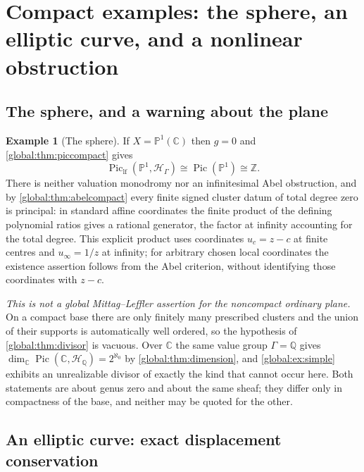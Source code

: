 \documentclass[11pt,letterpaper]{article}
\theoremstyle{definition}
\newtheorem{example}[example]{Example}
\theoremstyle{remark}
\newcommand{\C}{\mathbb C}
\newcommand{\Z}{\mathbb Z}
\newcommand{\Q}{\mathbb Q}
\newcommand{\HH}{\mathscr H_\Gamma}
\newcommand{\Pic}{\operatorname{Pic}}
\newcommand{\Piclf}{\operatorname{Pic}_{\mathrm{lf}}}
\numberwithin{equation}{section}
\begin{document}
\section{Compact examples: the sphere, an elliptic curve, and a nonlinear obstruction}\label{global:sec:compactexamples}

\subsection{The sphere, and a warning about the plane}

\begin{example}[The sphere]\label{global:ex:sphere}
If $X=\mathbb P^1(\C)$ then $g=0$ and \cref{global:thm:piccompact} gives
\[
  \Piclf(\mathbb P^1,\HH)\cong\Pic(\mathbb P^1)\cong\Z .
\]
There is neither valuation monodromy nor an infinitesimal Abel obstruction, and by \cref{global:thm:abelcompact} every finite signed cluster datum of total degree zero is principal: in standard affine coordinates the finite product of the defining polynomial ratios gives a rational generator, the factor at infinity accounting for the total degree. This explicit product uses coordinates $u_c=z-c$ at finite centres and $u_\infty=1/z$ at infinity; for arbitrary chosen local coordinates the existence assertion follows from the Abel criterion, without identifying those coordinates with $z-c$.

\emph{This is not a global Mittag--Leffler assertion for the noncompact ordinary plane.} On a compact base there are only finitely many prescribed clusters and the union of their supports is automatically well ordered, so the hypothesis of \cref{global:thm:divisor} is vacuous. Over $\C$ the same value group $\Gamma=\Q$ gives $\dim_\C\Pic(\C,\mathscr H_\Q)=2^{\aleph_0}$ by \cref{global:thm:dimension}, and \cref{global:ex:simple} exhibits an unrealizable divisor of exactly the kind that cannot occur here. Both statements are about genus zero and about the same sheaf; they differ only in compactness of the base, and neither may be quoted for the other.
\end{example}

\subsection{An elliptic curve: exact displacement conservation}
\end{document}
